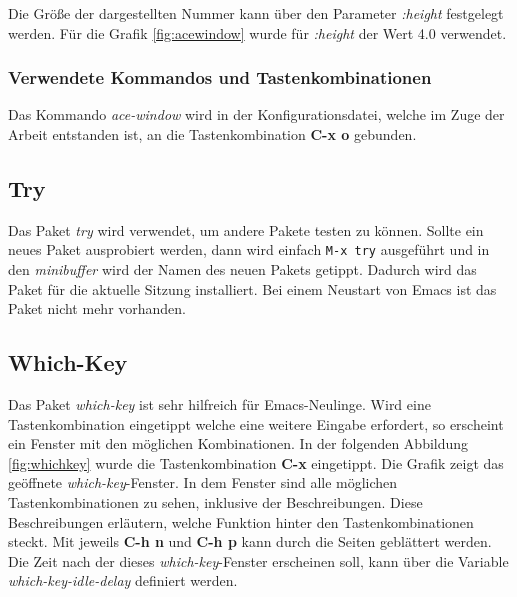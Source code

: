 Die Größe der dargestellten Nummer kann über den Parameter
\textit{:height} festgelegt werden. Für die Grafik \ref{fig:acewindow}
wurde für \textit{:height} der Wert 4.0 verwendet.\\

\subsubsection{Verwendete Kommandos und Tastenkombinationen}
Das Kommando \textit{ace-window} wird in der Konfigurationsdatei,
welche im Zuge der Arbeit entstanden ist, an die Tastenkombination
\textbf{C-x o} gebunden.\\

\subsection{Try}
\label{subsec:try}
Das Paket \textit{try} wird verwendet, um andere Pakete testen zu
können. Sollte ein neues Paket ausprobiert werden, dann wird einfach
\texttt{M-x try} ausgeführt und in den \textit{minibuffer} wird der
Namen des neuen Pakets getippt. Dadurch wird das Paket für die
aktuelle Sitzung installiert. Bei einem Neustart von Emacs ist das
Paket nicht mehr vorhanden. \cite{Try}\\

\subsection{Which-Key}
\label{subsec:whichkey}
Das Paket \textit{which-key} ist sehr hilfreich für
Emacs-Neulinge. Wird eine Tastenkombination eingetippt welche eine
weitere Eingabe erfordert, so erscheint ein Fenster mit den möglichen
Kombinationen. In der folgenden Abbildung \ref{fig:whichkey} wurde die
Tastenkombination \textbf{C-x} eingetippt. Die Grafik zeigt das
geöffnete \textit{which-key}-Fenster. In dem Fenster sind alle
möglichen Tastenkombinationen zu sehen, inklusive der
Beschreibungen. Diese Beschreibungen erläutern, welche Funktion hinter
den Tastenkombinationen steckt. Mit jeweils \textbf{C-h n} und
\textbf{C-h p} kann durch die Seiten {\glqq}geblättert{\grqq}
werden. Die Zeit nach der dieses \textit{which-key}-Fenster erscheinen
soll, kann über die Variable \textit{which-key-idle-delay} definiert
werden. \cite{WhichKey}\\

